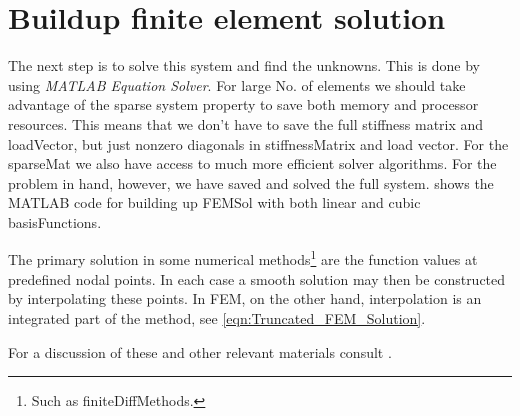 \section{Buildup finite element solution}
The next step is to solve this system and find the unknowns. This is done by using \emph{MATLAB Equation Solver}. For large No.
of elements we should take advantage of the sparse system property to save both memory and processor resources. This means that
we don't have to save the full stiffness matrix and \gls{loadVector}, but just nonzero diagonals in \gls{stiffnessMatrix} and load vector.
For the \gls{sparseMat} we also have access to much more efficient solver \glspl{algorithm}. For the problem in hand,
however, we have saved and solved the full system.  shows the MATLAB code for building up \gls{FEMSol} with
both linear and cubic \glspl{basisFunction}.
\begin{remark}
	The primary solution in some numerical methods\footnote{Such as \glspl{finiteDiffMethod}.} are the function values at
	predefined nodal points. In each case a smooth solution may then be constructed by interpolating these points. In FEM, on the
	other hand, interpolation is an integrated part of the method, see \cref{eqn:Truncated_FEM_Solution}.
\end{remark}	\text{}
For a discussion of these and other relevant materials consult \cite{Bertoti:1997,Carlson:1967,KarelRektorys:1975,Szeidl:2001}.